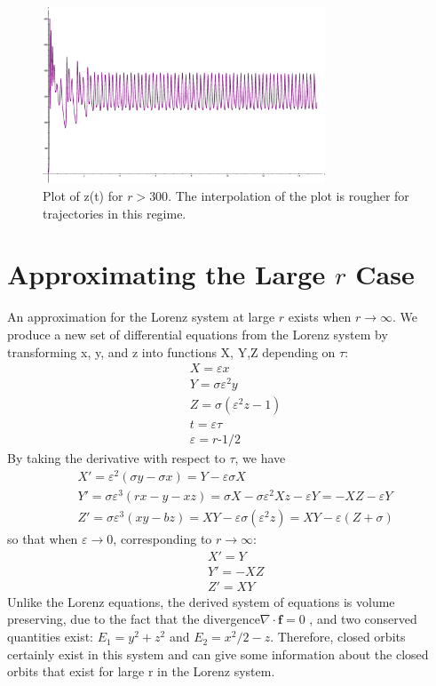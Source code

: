 \documentclass{report}
\begin{document}
\begin{figure}[ht]
  \centering
  \includegraphics[width=0.75\textwidth]{purplez.eps}
  \caption{Plot of z(t) for \(r > 300\). The interpolation of the plot is
rougher for trajectories in this regime.}
  \label{fig:bigr-z}
\end{figure}

\section{Approximating the Large \(r\) Case}

  An approximation for the Lorenz system at large \(r\) exists when \(r
\rightarrow \infty \). We produce a new set of differential equations from
the Lorenz system by transforming x, y, and z into functions X, Y,Z depending
on \(\tau\):
\begin{align*}
  &X = \varepsilon x \\
  &Y = \sigma\varepsilon^2 y \\
  &Z = \sigma(\varepsilon^2z-1) \\
  &t = \varepsilon\tau \\
  &\varepsilon = r\mbox{-1/2}
\end{align*}
By taking the derivative with respect to \(\tau\), we have
\begin{align*}
  &X' = \varepsilon^2(\sigma y -\sigma x) = Y - \varepsilon\sigma X\\
  &Y' = \sigma\varepsilon^3(rx-y-xz) = \sigma X - \sigma\varepsilon^2 Xz -
\varepsilon Y = -XZ - \varepsilon Y \\
  &Z' = \sigma\varepsilon^3(xy-bz) = XY - \varepsilon\sigma(\varepsilon^2z) =
XY - \varepsilon(Z+\sigma)
\end{align*}
so that when \(\varepsilon \rightarrow 0\), corresponding to \(r \rightarrow
\infty \):
\begin{align*}
  &X' = Y \\
  &Y' = -XZ \\
  &Z' = XY
\end{align*}
Unlike the Lorenz equations, the derived system of equations is volume
preserving, due to the fact that the divergence\(\nabla\cdot\boldsymbol{f} = 0\)
, and two conserved quantities exist: \(E_1 = y^2 + z^2\) and \(E_2 = x^2/2 - z\).
Therefore, closed orbits certainly exist in this system and can give some
information about the closed orbits that exist for large r in the Lorenz
system.
\end{document}
